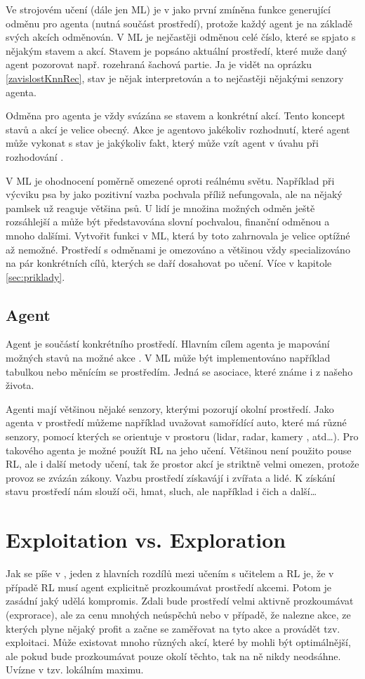 \documentclass{article}
\begin{document}
Ve strojovém učení (dále jen ML) je v \cite{sutton1999reinforcement} jako první zmíněna funkce generující odměnu pro agenta (nutná součást prostředí), protože každý agent je na základě svých akcích odměnován. V ML je nejčastěji odměnou celé číslo, které se spjato s nějakým stavem a akcí. Stavem je popsáno aktuální prostředí, které muže daný agent pozorovat např. rozehraná šachová partie. Ja je vidět na oprázku \ref{zavislostKnnRec}, stav je nějak interpretován a to nejčastěji nějakými senzory agenta. 

Odměna pro agenta je vždy svázána se stavem a konkrétní akcí. Tento koncept stavů a akcí je velice obecný. Akce je  agentovo jakékoliv rozhodnutí, které agent může vykonat s stav je jakýkoliv fakt, který může vzít agent v úvahu při rozhodování \cite{sutton1999reinforcement}. 

V ML je ohodnocení poměrně omezené oproti reálnému světu. Například při výcviku psa by jako pozitivní vazba pochvala příliž nefungovala, ale na nějaký pamlsek už reaguje většina psů. U lidí je množina možných odměn ještě rozsáhlejší a může být představována slovní pochvalou, finanční odměnou a mnoho dalšími. Vytvořit funkci v ML, která by toto zahrnovala je velice optížné až nemožné. Prostředí s odměnami je omezováno a většinou vždy specializováno na pár konkrétních cílů, kterých se daří dosahovat po učení. Více v kapitole \ref{sec:priklady}.


\subsection{Agent}
Agent je součástí konkrétního prostředí. Hlavním cílem agenta je mapování možných stavů na možné akce \cite{sutton1999reinforcement}. V ML může být implementováno například tabulkou nebo měnícím se prostředím. Jedná se asociace, které známe i z našeho života. 

Agenti mají většinou nějaké senzory, kterými pozorují okolní prostředí. Jako agenta v prostředí můžeme například uvažovat samořídící auto, které má různé senzory, pomocí kterých se orientuje v prostoru (lidar, radar, kamery , atd\dots). Pro takového agenta je možné použít RL na jeho učení. Většinou není použito pouse RL, ale i další metody učení, tak že prostor akcí je striktně velmi omezen, protože provoz se zvázán zákony. Vazbu prostředí získavájí i zvířata a lidé. K získání stavu prostředí nám slouží oči, hmat, sluch, ale například i čich a další\dots 


\section{Exploitation vs. Exploration}
Jak se píše v \cite{kaelbling1996reinforcement}, jeden z hlavních rozdílů mezi učením s učitelem a RL je, že v případě RL musí agent explicitně prozkoumávat prostředí akcemi. Potom je zasádní jaký udělá kompromis. Zdali bude prostředí velmi aktivně prozkoumávat (exprorace), ale za cenu mnohých neúspěchů nebo v případě, že nalezne akce, ze kterých plyne nějaký profit a začne se zaměřovat na tyto akce a provádět tzv. exploitaci. Může existovat mnoho různých akcí, které by mohli být optimálnější, ale pokud bude prozkoumávat pouze okolí těchto, tak na ně nikdy neodsáhne. Uvízne v tzv. lokálním maximu.
\end{document}
